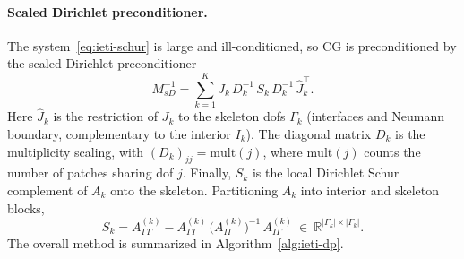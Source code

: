 \documentclass{article}
\newcommand{\R}{\mathbb{R}}
\newcommand{\skel}{\Gamma} %
\newcommand{\npatch}{K} %
\newcommand{\Aloc}[1]{A_{#1}}                    %
\newcommand{\Jloc}[1]{J_{#1}}                    %
\newcommand{\Jskel}[1]{\widehat{J}_{#1}}         %
\newcommand{\Sloc}[1]{S_{#1}}                    %
\newcommand{\Psd}{M_{sD}^{-1}}                   %
\newcommand{\Dmult}[1]{D_{#1}}                   %
\theoremstyle{plain}
\numberwithin{equation}{section}
\begin{document}
\paragraph{Scaled Dirichlet preconditioner.}
The system~\eqref{eq:ieti-schur} is large and ill-conditioned, so CG is
preconditioned by the scaled Dirichlet preconditioner~\cite{kleiss2012ieti,
    pechstein2013finite}
\begin{equation}
    \Psd = \sum_{k=1}^{\npatch}
    \Jskel{k}\, \Dmult{k}^{-1}\, \Sloc{k}\, \Dmult{k}^{-1}\, \Jskel{k}^{\top}.
    \label{eq:scaled-dirichlet}
\end{equation}
Here $\Jskel{k}$ is the restriction of $\Jloc{k}$ to the skeleton dofs $\skel_k$
(interfaces and Neumann boundary, complementary to the interior $I_k$).
The diagonal matrix $\Dmult{k}$ is the multiplicity scaling, with
$(\Dmult{k})_{jj} = \mathrm{mult}(j)$, where $\mathrm{mult}(j)$ counts the
number of patches sharing dof $j$.
Finally, $\Sloc{k}$ is the local Dirichlet Schur complement of $\Aloc{k}$ onto
the skeleton. Partitioning $\Aloc{k}$ into interior and skeleton blocks,
\begin{equation}
    \Sloc{k} = A^{(k)}_{\skel\skel}
    - A^{(k)}_{\skel I}\, \bigl(A^{(k)}_{II}\bigr)^{-1}\, A^{(k)}_{I\skel}
    \ \in\ \R^{|\skel_k| \times |\skel_k|}.
    \label{eq:local-schur}
\end{equation}
The overall method is summarized in Algorithm~\ref{alg:ieti-dp}.
\end{document}

